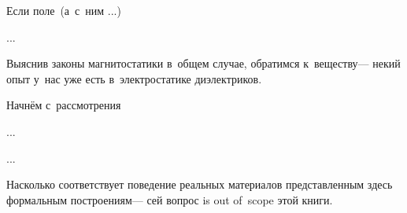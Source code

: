 

\begin{otherlanguage}{russian}

Если поле~(а~с~ним ...)

...

\end{otherlanguage}



\begin{otherlanguage}{russian}

Выяснив законы магнитостатики в~общем случае, обратимся к~веществу\:--- некий опыт у~нас уже есть в~электростатике ди\-элект\-ри\-ков.

Начнём с~рассмотрения

...


...

Насколько соответствует поведение реальных материалов представленным здесь формальным построениям\:--- сей вопрос is out of~scope этой книги.

\end{otherlanguage}



